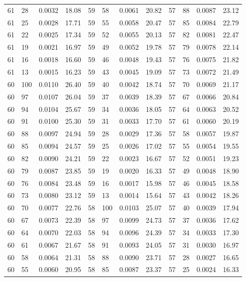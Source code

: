 \begin{tabular}{llll|llll|llll}
61 & 28 & 0.0032 & 18.08 & 59 & 58 & 0.0061 & 20.82 & 57 & 88 & 0.0087 & 23.12\\
61 & 25 & 0.0028 & 17.71 & 59 & 55 & 0.0058 & 20.47 & 57 & 85 & 0.0084 & 22.79\\
61 & 22 & 0.0025 & 17.34 & 59 & 52 & 0.0055 & 20.13 & 57 & 82 & 0.0081 & 22.47\\
61 & 19 & 0.0021 & 16.97 & 59 & 49 & 0.0052 & 19.78 & 57 & 79 & 0.0078 & 22.14\\
61 & 16 & 0.0018 & 16.60 & 59 & 46 & 0.0048 & 19.43 & 57 & 76 & 0.0075 & 21.82\\
61 & 13 & 0.0015 & 16.23 & 59 & 43 & 0.0045 & 19.09 & 57 & 73 & 0.0072 & 21.49\\
60 & 100 & 0.0110 & 26.40 & 59 & 40 & 0.0042 & 18.74 & 57 & 70 & 0.0069 & 21.17\\
60 & 97 & 0.0107 & 26.04 & 59 & 37 & 0.0039 & 18.39 & 57 & 67 & 0.0066 & 20.84\\
60 & 94 & 0.0104 & 25.67 & 59 & 34 & 0.0036 & 18.05 & 57 & 64 & 0.0063 & 20.52\\
60 & 91 & 0.0100 & 25.30 & 59 & 31 & 0.0033 & 17.70 & 57 & 61 & 0.0060 & 20.19\\
60 & 88 & 0.0097 & 24.94 & 59 & 28 & 0.0029 & 17.36 & 57 & 58 & 0.0057 & 19.87\\
60 & 85 & 0.0094 & 24.57 & 59 & 25 & 0.0026 & 17.02 & 57 & 55 & 0.0054 & 19.55\\
60 & 82 & 0.0090 & 24.21 & 59 & 22 & 0.0023 & 16.67 & 57 & 52 & 0.0051 & 19.23\\
60 & 79 & 0.0087 & 23.85 & 59 & 19 & 0.0020 & 16.33 & 57 & 49 & 0.0048 & 18.90\\
60 & 76 & 0.0084 & 23.48 & 59 & 16 & 0.0017 & 15.98 & 57 & 46 & 0.0045 & 18.58\\
60 & 73 & 0.0080 & 23.12 & 59 & 13 & 0.0014 & 15.64 & 57 & 43 & 0.0042 & 18.26\\
60 & 70 & 0.0077 & 22.76 & 58 & 100 & 0.0103 & 25.07 & 57 & 40 & 0.0039 & 17.94\\
60 & 67 & 0.0073 & 22.39 & 58 & 97 & 0.0099 & 24.73 & 57 & 37 & 0.0036 & 17.62\\
60 & 64 & 0.0070 & 22.03 & 58 & 94 & 0.0096 & 24.39 & 57 & 34 & 0.0033 & 17.30\\
60 & 61 & 0.0067 & 21.67 & 58 & 91 & 0.0093 & 24.05 & 57 & 31 & 0.0030 & 16.97\\
60 & 58 & 0.0064 & 21.31 & 58 & 88 & 0.0090 & 23.71 & 57 & 28 & 0.0027 & 16.65\\
60 & 55 & 0.0060 & 20.95 & 58 & 85 & 0.0087 & 23.37 & 57 & 25 & 0.0024 & 16.33\\

\end{tabular}
